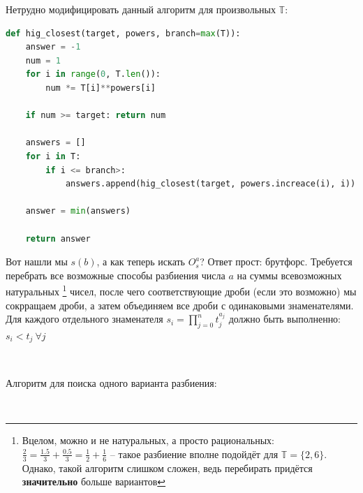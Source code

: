 \vspace{0.35in}

\noindent Нетрудно модифицировать данный алгоритм для произвольных $\mathbb{T}$:

\vspace{0.2in}

\begin{lstlisting}[title={Python}, language={Python}]
def hig_closest(target, powers, branch=max(T)):
	answer = -1
	num = 1
	for i in range(0, T.len()):
		num *= T[i]**powers[i]
	
	if num >= target: return num
	
	answers = []
	for i in T:
		if i <= branch>:
			answers.append(hig_closest(target, powers.increace(i), i))
	
	answer = min(answers)
	
	return answer
\end{lstlisting}

\vspace{0.5in}




Вот нашли мы $s(b)$, а как теперь искать $O_s^a$? Ответ прост: брутфорс. Требуется перебрать все возможные способы разбиения числа $a$ на суммы всевозможных натуральных%
\footnote{Вцелом, можно и не натуральных, а просто рациональных: $\frac23 = \frac{1.5}3 + \frac{0.5}3 = \frac12 + \frac16$ -- такое разбиение вполне подойдёт для $\mathbb{T} = \{2, 6\}$. Однако, такой алгоритм слишком сложен, ведь перебирать придётся \textbf{значительно} больше вариантов}
чисел, после чего соответствующие дроби (если это возможно) мы сокрращаем дроби, а затем объединяем все дроби с одинаковыми знаменателями. Для каждого отдельного знаменателя $s_i = \prod_{j=0}^n t_j^{a_j}$ должно быть выполненно: $s_i < t_j \ \forall j$

%

\

\noindent Алгоритм для поиска одного варианта разбиения:

\

